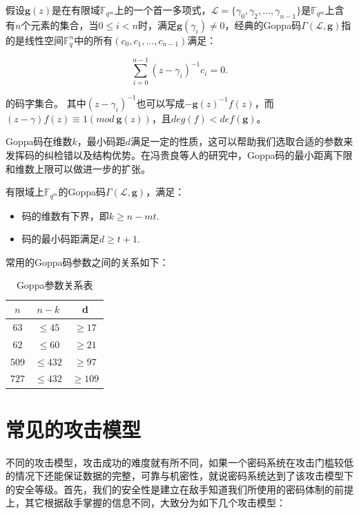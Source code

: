 \begin{define}[Goppa码]
	假设$\mathbf{g}(z)$是在有限域$\mathbb{F}_{q^m}$上的一个首一多项式，$\mathcal{L}=\{\gamma_0,\gamma_2,...,\gamma_{n-1}\}$是$\mathbb{F}_{q^m}$上含有$n$个元素的集合，当$0 \leq i <n$时，满足$\mathbf{g}(\gamma_i)\neq0$，经典的Goppa码$\Gamma(\mathcal{L},\mathbf{g})$指的是线性空间$\mathbb{F}_q^n$中的所有$(c_0,c_1,...,c_{n-1})$满足：
	
    \begin{equation}
        \sum_{i=0}^{n-1} (z - \gamma_i)^{-1}c_i = 0.
    \end{equation}
	
	\begin{flushleft}
		的码字集合。 其中$(z - \gamma_i)^{-1}$也可以写成$-\mathbf{g}(z)^{-1}f(z)$，而$(z-\gamma)f(z) \equiv 1(mod~\mathbf{g}(z))$，且$deg(f) < def(\mathbf{g})$。
	\end{flushleft}
\end{define}

Goppa码在维数$k$，最小码距$d$满足一定的性质，这可以帮助我们选取合适的参数来发挥码的纠检错以及结构优势。在冯贵良等人的研究\cite{冯贵良1983Goppa}中，Goppa码的最小距离下限和维数上限可以做进一步的扩张。

\begin{theorem}
	有限域上$\mathbb{F}_{q^m}$的Goppa码$\Gamma(\mathcal{L},\mathbf{g})$，满足：
	\begin{itemize}
		\item 码的维数有下界，即$k \geq n - mt$.
		\item 码的最小码距满足$d \geq t + 1$.
	\end{itemize}
\end{theorem}

常用的Goppa码参数之间的关系如下：

\begin{table}[H]
	\centering
	\begin{tabular}{c|c|c}
		\hline
		$n$ & $n - k$ & d\\ \hline
		$63$ & $\leq 45$ & $\geq 17$\\
		$62$ & $\leq 60$ & $\geq 21$\\
		$509$ & $\leq 432$ & $\geq 97$\\
		$727$ & $\leq 432$ & $\geq 109$\\
		\hline		
	\end{tabular}
	\caption{Goppa参数关系表}\label{GoppaParameters}
\end{table}

\section{常见的攻击模型}
不同的攻击模型，攻击成功的难度就有所不同，如果一个密码系统在攻击门槛较低的情况下还能保证数据的完整，可靠与机密性，就说密码系统达到了该攻击模型下的安全等级。首先，我们的安全性是建立在敌手知道我们所使用的密码体制的前提上，其它根据敌手掌握的信息不同，大致分为如下几个攻击模型：

